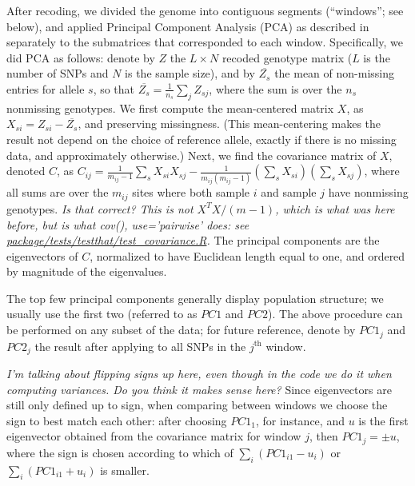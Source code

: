 \documentclass[11pt, oneside]{article}   	%
\newcommand{\plr}[1]{{\em \color{blue} #1}}
\newcommand{\pcone}{PC1}
\newcommand{\pctwo}{PC2}
\begin{document}
After recoding, we divided the genome into contiguous segments (``windows''; see below),
and applied Principal Component Analysis (PCA) as described in \citet{mcvean2009genealogical}
separately to the submatrices that corresponded to each window.
Specifically, we did PCA as follows:
denote by $Z$ the $L\times N$ recoded genotype matrix ($L$ is the number of SNPs and $N$ is the sample size), 
and by $\overline{Z_{s}}$ the mean of non-missing entries for allele $s$, 
so that $\overline{Z_{s}}=\frac{1}{n_s}\sum_j Z_{sj}$, 
where the sum is over the $n_s$ nonmissing genotypes.
We first compute the mean-centered matrix $X$, as $X_{si}=Z_{si}-\overline{Z_{s}}$,
and preserving missingness.
(This mean-centering makes the result not depend on the choice of reference allele,
exactly if there is no missing data, and approximately otherwise.)
Next, we find the covariance matrix of $X$, denoted $C$,
as $C_{ij} = \frac{1}{m_{ij}-1} \sum_s X_{si} X_{sj} - \frac{1}{m_{ij}(m_{ij}-1)} (\sum_s X_{si})(\sum_s X_{sj})$,
where all sums are over the $m_{ij}$ sites where both sample $i$ and sample $j$ have nonmissing genotypes.
\plr{Is that correct? This is not $X^T X/(m-1)$, which is what was here before, 
     but is what cov(), use='pairwise' does: see \url{package/tests/testthat/test_covariance.R}.}
The principal components are the eigenvectors of $C$, 
normalized to have Euclidean length equal to one,
and ordered by magnitude of the eigenvalues.

The top few principal components generally display population structure; 
we usually use the first two (referred to as $\pcone$ and $\pctwo$).
The above procedure can be performed on any subset of the data;
for future reference, denote by $\pcone_j$ and $\pctwo_j$
the result after applying to all SNPs in the $j^\text{th}$ window.

\plr{I'm talking about flipping signs up here, even though in the code we do it when computing variances. Do you think it makes sense here?}
Since eigenvectors are still only defined up to sign,
when comparing between windows we choose the sign to best match each other:
after choosing $\pcone_1$, for instance, and $u$ is the first eigenvector obtained from the covariance matrix
for window $j$,
then $\pcone_j = \pm u$,
where the sign is chosen according to which of 
$\sum_i (\pcone_{i1} - u_i)$ or
$\sum_i (\pcone_{i1} + u_i)$ 
is smaller.
\end{document}
